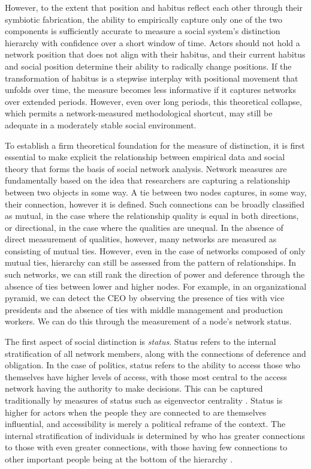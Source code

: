 \documentclass[12pt]{article}
\begin{document}
However, to the extent that position and habitus reflect each other through their symbiotic fabrication, the ability to empirically capture only one of the two components is sufficiently accurate to measure a social system's distinction hierarchy with confidence over a short window of time. Actors should not hold a network position that does not align with their habitus, and their current habitus and social position determine their ability to radically change positions. If the transformation of habitus is a stepwise interplay with positional movement that unfolds over time, the measure becomes less informative if it captures networks over extended periods. However, even over long periods, this theoretical collapse, which permits a network-measured methodological shortcut, may still be adequate in a moderately stable social environment. 

To establish a firm theoretical foundation for the measure of distinction, it is first essential to make explicit the relationship between empirical data and social theory that forms the basis of social network analysis. Network measures are fundamentally based on the idea that researchers are capturing a relationship between two objects in some way. A tie between two nodes captures, in some way, their connection, however it is defined. Such connections can be broadly classified as mutual, in the case where the relationship quality is equal in both directions, or directional, in the case where the qualities are unequal. In the absence of direct measurement of qualities, however, many networks are measured as consisting of mutual ties. However, even in the case of networks composed of only mutual ties, hierarchy can still be assessed from the pattern of relationships. In such networks, we can still rank the direction of power and deference through the absence of ties between lower and higher nodes. For example, in an organizational pyramid, we can detect the CEO by observing the presence of ties with vice presidents and the absence of ties with middle management and production workers. We can do this through the measurement of a node's network status. 

The first aspect of social distinction is \textit{status}. Status refers to the internal stratification of all network members, along with the connections of deference and obligation. In the case of politics, status refers to the ability to access those who themselves have higher levels of access, with those most central to the access network having the authority to make decisions. This can be captured traditionally by measures of status such as eigenvector centrality \citep{bonacich1972norms}. Status is higher for actors when the people they are connected to are themselves influential, and accessibility is merely a political reframe of the context. The internal stratification of individuals is determined by who has greater connections to those with even greater connections, with those having few connections to other important people being at the bottom of the hierarchy \citep{bonacich1972norms}. 
\end{document}
